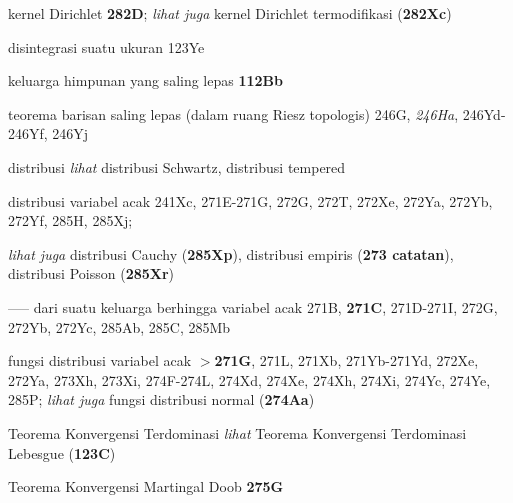 kernel Dirichlet {\bf 282D};
{\it lihat juga} kernel Dirichlet termodifikasi ({\bf 282Xc})















disintegrasi suatu ukuran 123Ye


keluarga himpunan yang saling lepas {\bf 112Bb}



teorema barisan saling lepas (dalam ruang Riesz topologis) 246G,
{\it 246Ha}, 246Yd-246Yf, 
246Yj






distribusi {\it lihat} distribusi Schwartz, distribusi tempered


distribusi variabel acak 241Xc,
271E-271G, 
272G, 272T, 272Xe, 272Ya, 272Yb, 272Yf, 285H, 285Xj;  
   
  {\it lihat juga} distribusi Cauchy ({\bf 285Xp}), distribusi empiris ({\bf 273 catatan}), distribusi Poisson ({\bf 285Xr})


----- dari suatu keluarga berhingga variabel acak  271B, {\bf 271C},
271D-271I, 
272G, 272Yb, 272Yc, 285Ab, 285C, 285Mb




fungsi distribusi variabel acak {\bf $\pmb{>}$271G}, 271L,
271Xb, 271Yb-271Yd, 
272Xe, 272Ya, 273Xh, 273Xi,
274F-274L, 
274Xd, 274Xe, 274Xh, 274Xi, 274Yc, 274Ye, 285P; 
  {\it lihat juga} fungsi distribusi normal ({\bf 274Aa})






















Teorema Konvergensi Terdominasi {\it lihat} Teorema Konvergensi Terdominasi Lebesgue ({\bf 123C})




Teorema Konvergensi Martingal Doob {\bf 275G}


